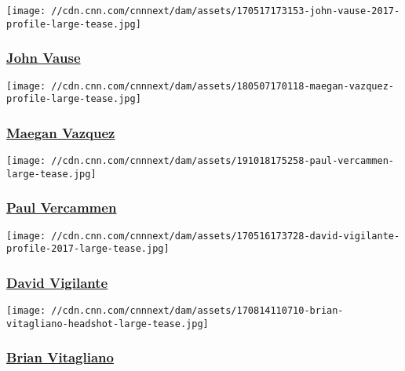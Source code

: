 \href{/profiles/john-vause-profile}{}

\texttt{[image: //cdn.cnn.com/cnnnext/dam/assets/170517173153-john-vause-2017-profile-large-tease.jpg]}

\hypertarget{john-vause}{%
\subsubsection{\texorpdfstring{\href{/profiles/john-vause-profile}{John
Vause}}{John Vause}}\label{john-vause}}

\href{/profiles/maegan-vazquez}{}

\texttt{[image: //cdn.cnn.com/cnnnext/dam/assets/180507170118-maegan-vazquez-profile-large-tease.jpg]}

\hypertarget{maegan-vazquez}{%
\subsubsection{\texorpdfstring{\href{/profiles/maegan-vazquez}{Maegan
Vazquez}}{Maegan Vazquez}}\label{maegan-vazquez}}

\href{/profiles/paul-vercammen}{}

\texttt{[image: //cdn.cnn.com/cnnnext/dam/assets/191018175258-paul-vercammen-large-tease.jpg]}

\hypertarget{paul-vercammen}{%
\subsubsection{\texorpdfstring{\href{/profiles/paul-vercammen}{Paul
Vercammen}}{Paul Vercammen}}\label{paul-vercammen}}

\href{/profiles/david-vigilante-profile}{}

\texttt{[image: //cdn.cnn.com/cnnnext/dam/assets/170516173728-david-vigilante-profile-2017-large-tease.jpg]}

\hypertarget{david-vigilante}{%
\subsubsection{\texorpdfstring{\href{/profiles/david-vigilante-profile}{David
Vigilante}}{David Vigilante}}\label{david-vigilante}}

\href{/profiles/brian-vitagliano}{}

\texttt{[image: //cdn.cnn.com/cnnnext/dam/assets/170814110710-brian-vitagliano-headshot-large-tease.jpg]}

\hypertarget{brian-vitagliano}{%
\subsubsection{\texorpdfstring{\href{/profiles/brian-vitagliano}{Brian
Vitagliano}}{Brian Vitagliano}}\label{brian-vitagliano}}

